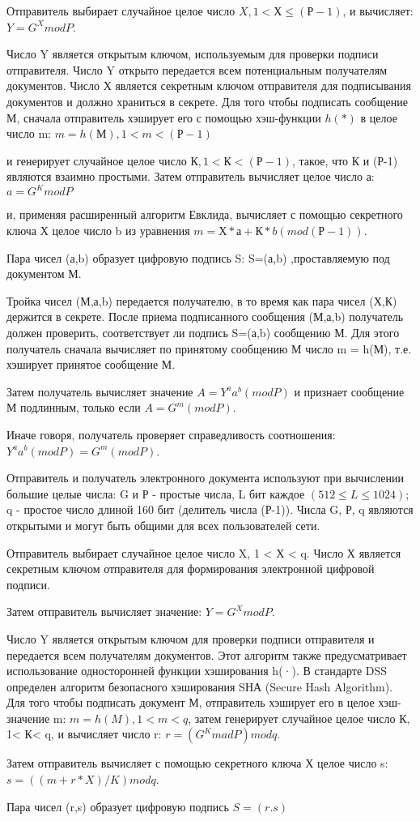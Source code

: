 Отправитель выбирает случайное целое число $X, 1 < Х \leq (Р-1)$, и вычисляет: $Y = G^{X} mod P$.

Число Y является открытым ключом, используемым для проверки подписи отправителя. Число Y открыто передается всем потенциальным получателям документов.
Число Х является секретным ключом отправителя для подписывания документов и должно храниться в секрете.
Для того чтобы подписать сообщение М, сначала отправитель хэширует его с помощью хэш-функции $h(*)$ в целое число m: $m = h(М), 1 < m < (Р-1)$

и генерирует случайное целое число $К, 1 < К < (Р-1)$, такое, что К и (Р-1) являются взаимно простыми. Затем отправитель вычисляет целое число а: $a = G^{K} mod P$ 

и, применяя расширенный алгоритм Евклида, вычисляет с помощью секретного ключа Х целое число b из уравнения $ m = Х * а + К * b (mod (Р-1))$. 

Пара чисел (а,b) образует цифровую подпись S: S=(а,b) ,проставляемую под документом М.

Тройка чисел (М,а,b) передается получателю, в то время как пара чисел (Х,К) держится в секрете.
После приема подписанного сообщения (М,а,b) получатель должен проверить, соответствует ли подпись S=(а,b) сообщению М. Для этого получатель сначала вычисляет по принятому сообщению М число m = h(М), т.е. хэширует принятое сообщение М.

Затем получатель вычисляет значение $A = Y^{a} a^{b} (mod P)$ и признает сообщение М подлинным, только если $A = G^{m} (mod P)$. 

Иначе говоря, получатель проверяет справедливость соотношения: $Y^{a} a^{b}(mod P) = G^m (mod P) $.



 Отправитель и получатель электронного документа используют при вычислении большие целые числа: G и Р - простые числа, L бит каждое $(512 \leq L \leq 1024)$; q - простое число длиной 160 бит (делитель числа (Р-1)). Числа G, Р, q являются открытыми и могут быть общими для всех пользователей сети.

Отправитель выбирает случайное целое число X, 1 < Х < q. Число Х является секретным ключом отправителя для формирования электронной цифровой подписи.

Затем отправитель вычисляет значение: $Y = G^{X} mod P$.

Число Y является открытым ключом для проверки подписи отправителя и передается всем получателям документов. Этот алгоритм также предусматривает использование односторонней функции хэширования h(·). В стандарте DSS определен алгоритм безопасного хэширования SНА (Secure Hash Algorithm). Для того чтобы подписать документ М, отправитель хэширует его в целое хэш-значение m: $ m = h(M), 1<m<q$, затем генерирует случайное целое число К, 1< К< q, и вычисляет число r: $r = (G^K mad P) mod q$.

Затем отправитель вычисляет с помощью секретного ключа Х целое число s: $s = ((m+r*X)/K) mod q$. 

Пара чисел (r,s) образует цифровую подпись $S = (r.s)$